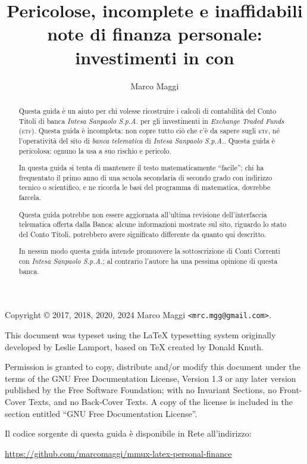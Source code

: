 \documentclass[12pt,a4paper]{article}
\author{Marco Maggi}
\title{Pericolose, incomplete e inaffidabili\\ note di finanza personale:\\investimenti in \Etf{} con \IntesaSanpaolo{}}
\newcommand{\IntesaSanpaolo}[0]{\emph{Intesa Sanpaolo S.p.A.}}
\newcommand{\Parentesi}[1]{(#1)}
\newcommand{\Etf}[1]{\textsc{etf}}
\begin{document}
\maketitle

\begin{abstract}
  \noindent
  Questa guida è un  aiuto per chi volesse ricostruire i calcoli di  contabilità del Conto Titoli di
  banca \IntesaSanpaolo{} per  gli investimenti in \emph{Exchange  Traded Funds} \Parentesi{\Etf{}}.
  Questa guida è  incompleta: non copre tutto ciò  che c'è da sapere sugli  \Etf{}, né l'operatività
  del sito  di \emph{banca telematica} di  \IntesaSanpaolo{}.  Questa guida è  pericolosa: ognuno la
  usa a suo rischio e pericolo.

  In questa guida si  tenta di mantenere il testo matematicamente ``facile'';  chi ha frequentato il
  primo anno  di una scuola secondaria  di secondo grado con  indirizzo tecnico o scientifico,  e ne
  ricorda le basi del programma di matematica, dovrebbe farcela.

  Questa  guida potrebbe  non  essere aggiornata  all'ultima  revisione dell'interfaccia  telematica
  offerta dalla Banca:  alcune informazioni mostrate sul  sito, riguardo lo stato  del Conto Titoli,
  potrebbero avere significato differente da quanto qui descritto.

  In  nessun  modo  questa  guida  intende  promuovere  la  sottoscrizione  di  Conti  Correnti  con
  \IntesaSanpaolo{}; al contrario l'autore ha una pessima opinione di questa banca.
\end{abstract}

\colophonparsize{12pt}
\colophonparalign{}
\begin{colophon}
  Copyright \copyright{} 2017, 2018, 2020, 2024 Marco Maggi \texttt{<mrc.mgg@gmail.com>}.

  This document  was typeset using  the \LaTeX{} typesetting  system originally developed  by Leslie
  Lamport, based on \TeX{} created by Donald Knuth.

  Permission is granted to  copy, distribute and/or modify this document under the  terms of the GNU
  Free  Documentation License,  Version 1.3  or any  later version  published by  the Free  Software
  Foundation; with no Invariant Sections, no Front-Cover  Texts, and no Back-Cover Texts.  A copy of
  the license is included in the section entitled ``GNU Free Documentation License''.

  Il codice sorgente di questa guida è disponibile in Rete all'indirizzo:
  \begin{center}
    \url{https://github.com/marcomaggi/mmux-latex-personal-finance}
  \end{center}
\end{colophon}
\end{document}
